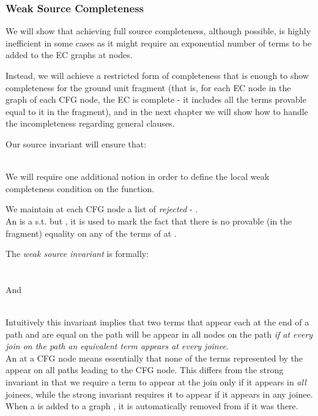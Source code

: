 \subsubsection*{Weak Source Completeness}
We will show that achieving full source completeness, although possible, is highly inefficient in some cases as it might require an exponential number of terms to be added to the EC graphs at nodes.

Instead, we will achieve a restricted form of completeness that is enough to show completeness for the ground unit fragment 
(that is, for each EC node in the graph of each CFG node, the EC is complete - it includes all the terms provable equal to it in the fragment), and in the next chapter we will show how to handle the incompleteness regarding general clauses.

Our source invariant will ensure that:\\
 \\

We will require one additional notion in order to define the local weak completeness condition on the  function.

We maintain at each CFG node  a list of \emph{rejected \GFAEC} - .\\
An \rgfa is a \GFAEC {} s.t.  but , it is used to mark the fact that there is no provable (in the fragment) equality on any of the terms of  at .

The \emph{weak source invariant} is formally:\\
\\
\\
And\\
\\

Intuitively this invariant implies that two terms that appear each at the end of a path and are equal on the path will be appear in all nodes on the path \emph{if at every join on the path an equivalent term appears at every joinee}.\\
An \rgfa at a CFG node means essentially that none of the terms represented by the \rgfa appear on all paths leading to the CFG node.
This differs from the strong invariant in that we require a term to appear at the join only if it appears in \emph{all} joinees,
while the strong invariant requires it to appear if it appears in any joinee.
When a \GFAEC {} is added to a graph , it is automatically removed from  if it was there.

